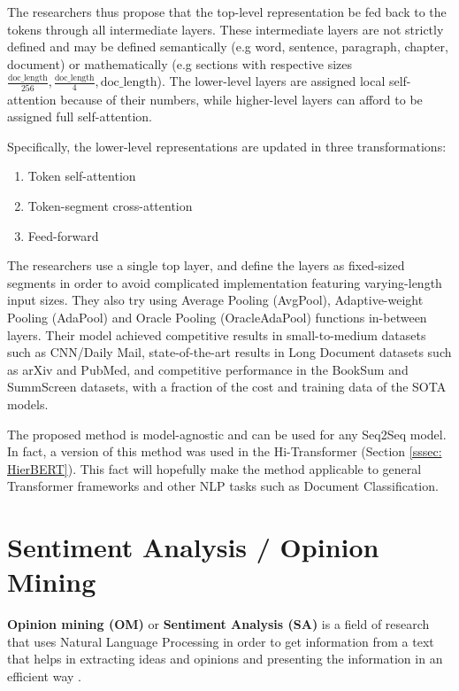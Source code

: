 \documentclass[preprint,review,12pt]{elsarticle}
\begin{document}
The researchers thus propose that the top-level representation be fed back to the tokens through all intermediate layers. These intermediate layers are not strictly defined and may be defined semantically (e.g word, sentence, paragraph, chapter, document) or mathematically (e.g sections with respective sizes $\frac{\text{doc\_length}}{256}, \frac{\text{doc\_length}}{4}, \text{doc\_length}$). The lower-level layers are assigned local self-attention because of their numbers, while higher-level layers can afford to be assigned full self-attention.

Specifically, the lower-level representations are updated in three transformations:
\begin{enumerate}
    \item Token self-attention
    \item Token-segment cross-attention
    \item Feed-forward
\end{enumerate}


The researchers use a single top layer, and define the layers as fixed-sized segments in order to avoid complicated implementation featuring varying-length input sizes. They also try using Average Pooling (AvgPool), Adaptive-weight Pooling (AdaPool) and Oracle Pooling (OracleAdaPool) functions in-between layers. Their model achieved competitive results in small-to-medium datasets such as CNN/Daily Mail, state-of-the-art results in Long Document datasets such as arXiv and PubMed, and competitive performance in the BookSum \cite{poland} and SummScreen \cite{summset} datasets, with a fraction of the cost and training data of the SOTA models.

The proposed method is model-agnostic and can be used for any Seq2Seq model. In fact, a version of this method was used in the Hi-Transformer \citet{qi} (Section \ref{sssec: HierBERT}). This fact will hopefully make the method applicable to general Transformer frameworks and other NLP tasks such as Document Classification.


\section{Sentiment Analysis / Opinion Mining}
\label{sec::Sentiment}

\textbf{Opinion mining (OM)} or \textbf{Sentiment Analysis (SA)} is a field of research that uses Natural Language Processing in order to get information from a text that helps in extracting ideas and opinions and presenting the information in an efficient way \cite{pakistan, sergio}. 
\end{document}
